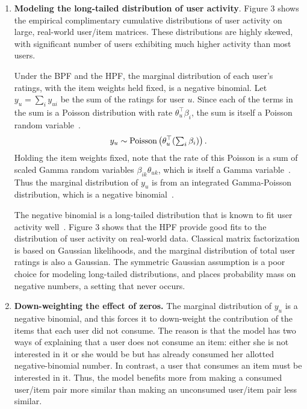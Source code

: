 \begin{enumerate}
\item {\bf Modeling the long-tailed distribution of user activity}.
Figure 3 shows the empirical complimentary cumulative distributions of
user activity on large, real-world user/item matrices. These
distributions are highly skewed, with significant number of users
exhibiting much higher activity than most users. 

Under the BPF and the HPF, the marginal distribution of each user's
ratings, with the item weights held fixed, is a negative binomial.
Let $y_{u} = \sum_{i} y_{ui}$ be the sum of the ratings for user $u$.
Since each of the terms in the sum is a Poisson distribution with rate
$\theta_u^\top \beta_i$, the sum is itself a Poisson random
variable~\cite{Johnson:2005}.
\begin{equation}
  y_u \sim \textrm{Poisson}\left(\theta_u^\top (\textstyle \sum_{i} \beta_{i})\right).
\end{equation}
Holding the item weights fixed, note that the rate of this Poisson is
a sum of scaled Gamma random variables $\beta_{ik} \theta_{uk}$, which
is itself a Gamma variable~\cite{Norman:1994}.  Thus the marginal
distribution of $y_u$ is from an integrated Gamma-Poisson
distribution, which is a negative binomial~\cite{Gelman:1995}.

The negative binomial is a long-tailed distribution that is known to
fit user activity well~\cite{Goodhardt:1984,Dunning:1993}.  Figure 3 shows
that the HPF provide good fits to the distribution of user activity on
real-world data.  Classical matrix factorization is based on Gaussian
likelihoods, and the marginal distribution of total user ratings is
also a Gaussian.  The symmetric Gaussian assumption is a poor choice
for modeling long-tailed distributions, and places probability mass on
negative numbers, a setting that never occurs.


\item {\bf Down-weighting the effect of zeros.}
The marginal distribution of $y_u$ is a negative binomial, and this
forces it to down-weight the contribution of the items that each user
did not consume. The reason is that the model has two ways of
explaining that a user does not consume an item: either she is not
interested in it or she would be but has already consumed her allotted
negative-binomial number.  In contrast, a user that consumes an item
must be interested in it.  Thus, the model benefits more from making a
consumed user/item pair more similar than making an unconsumed
user/item pair less similar.


\end{enumerate}
